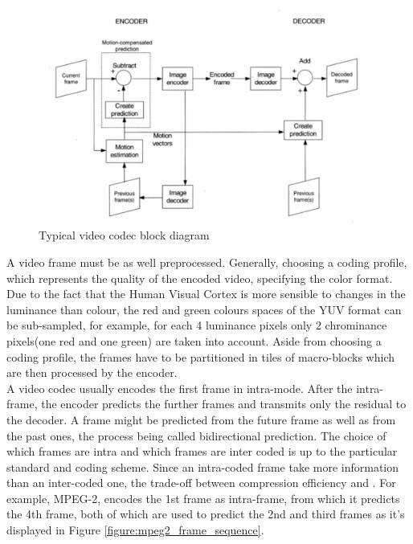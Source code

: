 \documentclass[a4paper,11pt,oneside]{article}
\begin{document}
\begin{figure}[h]
  \centering
  \includegraphics[width=\textwidth]{../figures/f1_codec_block_diagram.pdf}
  \caption{Typical video codec block diagram\cite[pp.~44]{richardson2002video}}
  \label{figure:codec_block_diagram}
\end{figure} 
\clearpage
\indent A video frame must be as well preprocessed. Generally, choosing a coding profile, which represents the quality of the encoded video, specifying the color format. Due to the fact that the Human Visual Cortex is more sensible to changes in the luminance than colour, the red and green colours spaces of the YUV format can be sub-sampled, for example, for each 4 luminance pixels only 2 chrominance pixels(one red and one green) are taken into account. Aside from choosing  a coding profile, the frames have to be partitioned in tiles of macro-blocks which are then processed by the encoder. \\
\indent A video codec usually encodes the first frame in intra-mode. After the intra-frame, the encoder predicts the further frames and transmits only the residual to the decoder. A frame might be predicted from the future frame as well as from the past ones, the process being called bidirectional prediction. The choice of which frames are intra and which frames are inter coded is up to the particular standard and coding scheme. Since an intra-coded frame take more information than an inter-coded one, the trade-off between compression efficiency and . For example, MPEG-2, encodes the 1st frame as intra-frame, from which it predicts the 4th frame, both of which are used to predict the 2nd and third frames as it's displayed in Figure \ref{figure:mpeg2_frame_sequence}. \\ 
\end{document}
